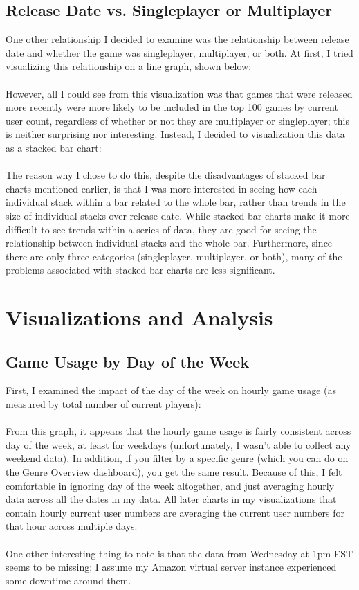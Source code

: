 \documentclass[pdftex,12pt,a4paper]{article}
\begin{document}
\subsection{Release Date vs. Singleplayer or Multiplayer}
One other relationship I decided to examine was the relationship between release date and whether the game was singleplayer, multiplayer, or both. At first, I tried visualizing this relationship on a line graph, shown below: \\ \\

However, all I could see from this visualization was that games that were released more recently were more likely to be included in the top 100 games by current user count, regardless of whether or not they are multiplayer or singleplayer; this is neither surprising nor interesting. Instead, I decided to visualization this data as a stacked bar chart: \\ \\

The reason why I chose to do this, despite the disadvantages of stacked bar charts mentioned earlier, is that I was more interested in seeing how each individual stack within a bar related to the whole bar, rather than trends in the size of individual stacks over release date. While stacked bar charts make it more difficult to see trends within a series of data, they are good for seeing the relationship between individual stacks and the whole bar. Furthermore, since there are only three categories (singleplayer, multiplayer, or both), many of the problems associated with stacked bar charts are less significant. 

\section{Visualizations and Analysis}
\subsection{Game Usage by Day of the Week}
First, I examined the impact of the day of the week on hourly game usage (as measured by total number of current players): \\ \\
From this graph, it appears that the hourly game usage is fairly consistent across day of the week, at least for weekdays (unfortunately, I wasn't able to collect any weekend data). In addition, if you filter by a specific genre (which you can do on the Genre Overview dashboard), you get the same result. Because of this, I felt comfortable in ignoring day of the week altogether, and just averaging hourly data across all the dates in my data. All later charts in my visualizations that contain hourly current user numbers are averaging the current user numbers for that hour across multiple days. \\ \\
One other interesting thing to note is that the data from Wednesday at 1pm EST seems to be missing; I assume my Amazon virtual server instance experienced some downtime around them.
\end{document}
